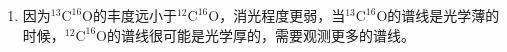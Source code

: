 \documentclass[a4paper]{article}
\begin{document}
\begin{enumerate}
\begin{enumerate}
        估计$^{13}\mathrm{C}^{16}\mathrm{O}$的$J=1$到$J=0$的转动跃迁频率为：
        \[
            f_{13}^\mathrm{rot} = f_{12}^\mathrm{rot} \frac{\mu_{12}}{\mu_{13}} = 3.69\,\mathrm{cm}^{-1}
        \]
        $v=1$到$v=0$的振动跃迁频率为：
        \[
            f_{13}^\mathrm{vib} = f_{12}^\mathrm{vib} \sqrt{\frac{\mu_{12}}{\mu_{13}}} = 2122\,\mathrm{cm}^{-1}
        \]

        \item[(c)]
        因为$^{13}\mathrm{C}^{16}\mathrm{O}$的丰度远小于$^{12}\mathrm{C}^{16}\mathrm{O}$，消光程度更弱，当$^{13}\mathrm{C}^{16}\mathrm{O}$的谱线是光学薄的时候，$^{12}\mathrm{C}^{16}\mathrm{O}$的谱线很可能是光学厚的，需要观测更多的谱线。
    \end{enumerate}
\end{enumerate}
\end{document}
